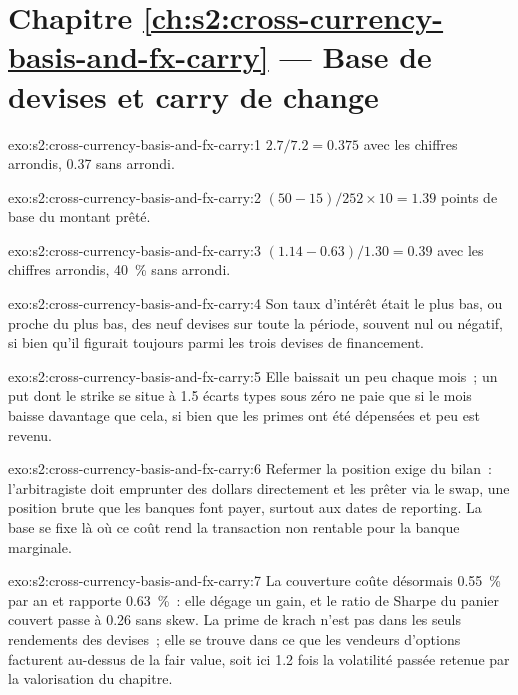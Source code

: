 \section*{Chapitre \ref{ch:s2:cross-currency-basis-and-fx-carry} --- Base de devises et carry de change}

\begin{solution}{exo:s2:cross-currency-basis-and-fx-carry:1}
$2.7/7.2 = 0.375$ avec les chiffres arrondis, 0.37 sans arrondi.
\end{solution}

\begin{solution}{exo:s2:cross-currency-basis-and-fx-carry:2}
$(50 - 15)/252 \times 10 = 1.39$ points de base du montant prêté.
\end{solution}

\begin{solution}{exo:s2:cross-currency-basis-and-fx-carry:3}
$(1.14 - 0.63)/1.30 = 0.39$ avec les chiffres arrondis, 40~\% sans arrondi.
\end{solution}

\begin{solution}{exo:s2:cross-currency-basis-and-fx-carry:4}
Son taux d'intérêt était le plus bas, ou proche du plus bas, des neuf devises sur toute la période, souvent nul ou négatif, si bien qu'il
figurait toujours parmi les trois devises de financement.
\end{solution}

\begin{solution}{exo:s2:cross-currency-basis-and-fx-carry:5}
Elle baissait un peu chaque mois~; un put dont le strike se situe à 1.5 écarts types sous zéro ne paie que si le mois baisse davantage que cela, si bien que les primes
ont été dépensées et peu est revenu.
\end{solution}

\begin{solution}{exo:s2:cross-currency-basis-and-fx-carry:6}
Refermer la position exige du bilan~: l'arbitragiste doit emprunter des dollars directement et les prêter via le swap, une position brute que les banques font payer,
surtout aux dates de reporting. La base se fixe là où ce coût rend la transaction non rentable pour la banque marginale.
\end{solution}

\begin{solution}{exo:s2:cross-currency-basis-and-fx-carry:7}
La couverture coûte désormais 0.55~\% par an et rapporte 0.63~\%~: elle dégage un gain, et le ratio de Sharpe du panier couvert passe à 0.26 sans skew. La prime de krach
n'est pas dans les seuls rendements des devises~; elle se trouve dans ce que les vendeurs d'options facturent au-dessus de la fair value, soit ici 1.2 fois la volatilité passée
retenue par la valorisation du chapitre.
\end{solution}

